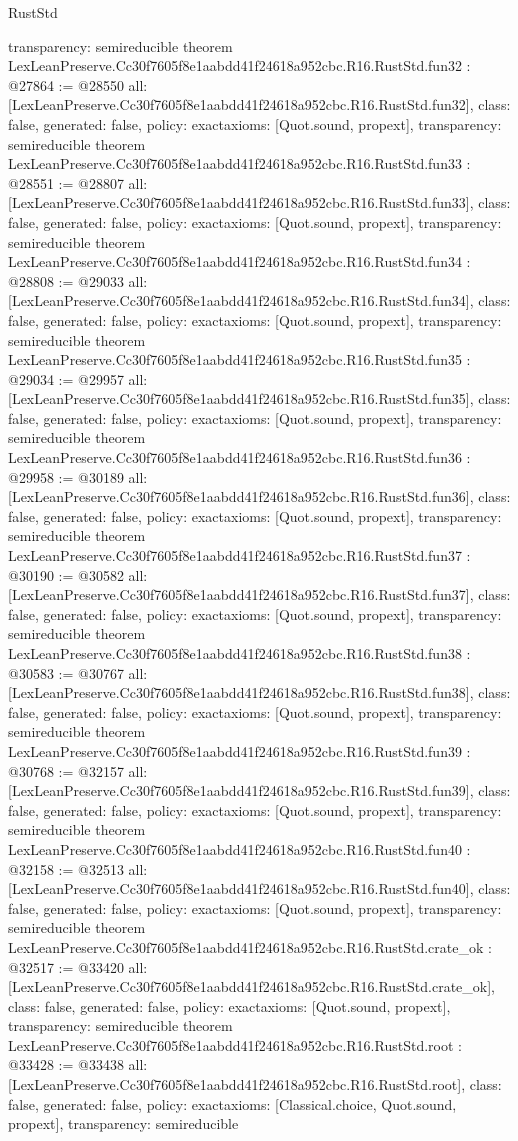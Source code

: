 \begin{lexlean}{RustStd}
\begin{coremodule}
{  transparency: semireducible
}
theorem LexLeanPreserve.Cc30f7605f8e1aabdd41f24618a952cbc.R16.RustStd.fun32 : @27864 := @28550 {
  all: [LexLeanPreserve.Cc30f7605f8e1aabdd41f24618a952cbc.R16.RustStd.fun32],
  class: false,
  generated: false,
  policy: exact{axioms: [Quot.sound, propext]},
  transparency: semireducible
}
theorem LexLeanPreserve.Cc30f7605f8e1aabdd41f24618a952cbc.R16.RustStd.fun33 : @28551 := @28807 {
  all: [LexLeanPreserve.Cc30f7605f8e1aabdd41f24618a952cbc.R16.RustStd.fun33],
  class: false,
  generated: false,
  policy: exact{axioms: [Quot.sound, propext]},
  transparency: semireducible
}
theorem LexLeanPreserve.Cc30f7605f8e1aabdd41f24618a952cbc.R16.RustStd.fun34 : @28808 := @29033 {
  all: [LexLeanPreserve.Cc30f7605f8e1aabdd41f24618a952cbc.R16.RustStd.fun34],
  class: false,
  generated: false,
  policy: exact{axioms: [Quot.sound, propext]},
  transparency: semireducible
}
theorem LexLeanPreserve.Cc30f7605f8e1aabdd41f24618a952cbc.R16.RustStd.fun35 : @29034 := @29957 {
  all: [LexLeanPreserve.Cc30f7605f8e1aabdd41f24618a952cbc.R16.RustStd.fun35],
  class: false,
  generated: false,
  policy: exact{axioms: [Quot.sound, propext]},
  transparency: semireducible
}
theorem LexLeanPreserve.Cc30f7605f8e1aabdd41f24618a952cbc.R16.RustStd.fun36 : @29958 := @30189 {
  all: [LexLeanPreserve.Cc30f7605f8e1aabdd41f24618a952cbc.R16.RustStd.fun36],
  class: false,
  generated: false,
  policy: exact{axioms: [Quot.sound, propext]},
  transparency: semireducible
}
theorem LexLeanPreserve.Cc30f7605f8e1aabdd41f24618a952cbc.R16.RustStd.fun37 : @30190 := @30582 {
  all: [LexLeanPreserve.Cc30f7605f8e1aabdd41f24618a952cbc.R16.RustStd.fun37],
  class: false,
  generated: false,
  policy: exact{axioms: [Quot.sound, propext]},
  transparency: semireducible
}
theorem LexLeanPreserve.Cc30f7605f8e1aabdd41f24618a952cbc.R16.RustStd.fun38 : @30583 := @30767 {
  all: [LexLeanPreserve.Cc30f7605f8e1aabdd41f24618a952cbc.R16.RustStd.fun38],
  class: false,
  generated: false,
  policy: exact{axioms: [Quot.sound, propext]},
  transparency: semireducible
}
theorem LexLeanPreserve.Cc30f7605f8e1aabdd41f24618a952cbc.R16.RustStd.fun39 : @30768 := @32157 {
  all: [LexLeanPreserve.Cc30f7605f8e1aabdd41f24618a952cbc.R16.RustStd.fun39],
  class: false,
  generated: false,
  policy: exact{axioms: [Quot.sound, propext]},
  transparency: semireducible
}
theorem LexLeanPreserve.Cc30f7605f8e1aabdd41f24618a952cbc.R16.RustStd.fun40 : @32158 := @32513 {
  all: [LexLeanPreserve.Cc30f7605f8e1aabdd41f24618a952cbc.R16.RustStd.fun40],
  class: false,
  generated: false,
  policy: exact{axioms: [Quot.sound, propext]},
  transparency: semireducible
}
theorem LexLeanPreserve.Cc30f7605f8e1aabdd41f24618a952cbc.R16.RustStd.crate_ok : @32517 := @33420 {
  all: [LexLeanPreserve.Cc30f7605f8e1aabdd41f24618a952cbc.R16.RustStd.crate_ok],
  class: false,
  generated: false,
  policy: exact{axioms: [Quot.sound, propext]},
  transparency: semireducible
}
theorem LexLeanPreserve.Cc30f7605f8e1aabdd41f24618a952cbc.R16.RustStd.root : @33428 := @33438 {
  all: [LexLeanPreserve.Cc30f7605f8e1aabdd41f24618a952cbc.R16.RustStd.root],
  class: false,
  generated: false,
  policy: exact{axioms: [Classical.choice, Quot.sound, propext]},
  transparency: semireducible
}


\end{coremodule}
\end{lexlean}
